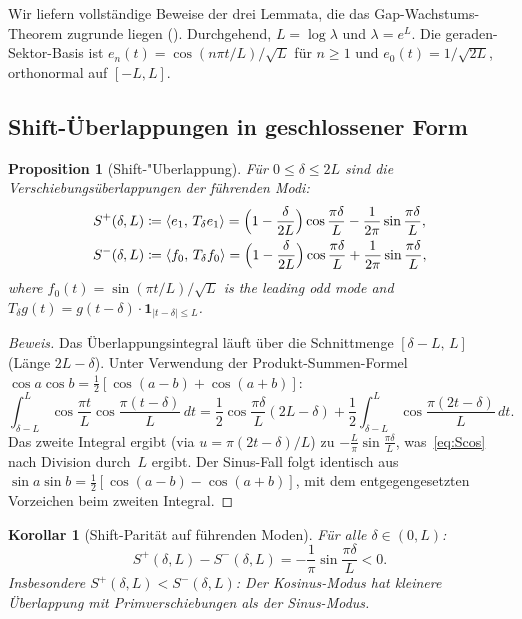 ﻿\documentclass[12pt,a4paper]{article}
\newtheorem{proposition}[theorem]{Proposition}
\newtheorem{corollary}[theorem]{Korollar}
\theoremstyle{definition}
\theoremstyle{remark}
\begin{document}
Wir liefern vollständige Beweise der drei Lemmata, die das Gap-Wachstums-Theorem zugrunde liegen (). Durchgehend, $L = \log\lambda$ und $\lambda = e^L$. Die geraden-Sektor-Basis ist $e_n(t) = \cos(n\pi t/L)/\sqrt{L}$ für $n \geq 1$ und $e_0(t) = 1/\sqrt{2L}$, orthonormal auf $[-L, L]$.

\subsection{Shift-\"Uberlappungen in geschlossener Form}

\begin{proposition}[Shift-"Uberlappung]
\label{prop:overlap-closed}
Für $0 \leq \delta \leq 2L$ sind die Verschiebungsüberlappungen der führenden Modi:
\begin{align}
  S^+(\delta, L) &\coloneqq \langle e_1,\, T_\delta e_1\rangle = \Bigl(1 - \frac{\delta}{2L}\Bigr)\cos\frac{\pi\delta}{L} - \frac{1}{2\pi}\sin\frac{\pi\delta}{L}, \label{eq:Scos} \\
  S^-(\delta, L) &\coloneqq \langle f_0,\, T_\delta f_0\rangle = \Bigl(1 - \frac{\delta}{2L}\Bigr)\cos\frac{\pi\delta}{L} + \frac{1}{2\pi}\sin\frac{\pi\delta}{L}, \label{eq:Ssin}
\end{align}
where $f_0(t) = \sin(\pi t/L)/\sqrt{L}$ is the leading odd mode and $T_\delta g(t) = g(t - \delta)\cdot\mathbf{1}_{|t-\delta|\leq L}$.
\end{proposition}

\begin{proof}[Beweis]
Das Überlappungsintegral läuft über die Schnittmenge $[\delta - L,\,L]$ (Länge $2L - \delta$). Unter Verwendung der Produkt-Summen-Formel $\cos a\cos b = \tfrac{1}{2}[\cos(a-b) + \cos(a+b)]$:
\[
  \int_{\delta-L}^{L} \cos\frac{\pi t}{L}\cos\frac{\pi(t-\delta)}{L}\,dt
  = \frac{1}{2}\cos\frac{\pi\delta}{L}(2L - \delta) + \frac{1}{2}\int_{\delta-L}^{L}\cos\frac{\pi(2t-\delta)}{L}\,dt.
\]
Das zweite Integral ergibt (via $u = \pi(2t-\delta)/L$) zu $-\frac{L}{\pi}\sin\frac{\pi\delta}{L}$, was~\eqref{eq:Scos} nach Division durch~$L$ ergibt. Der Sinus-Fall folgt identisch aus $\sin a\sin b = \tfrac{1}{2}[\cos(a-b) - \cos(a+b)]$, mit dem entgegengesetzten Vorzeichen beim zweiten Integral.
\end{proof}

\begin{corollary}[Shift-Parität auf führenden Moden]
\label{cor:diagonal-parity}
Für alle $\delta \in (0, L)$:
\begin{equation}
\label{eq:parity-diff}
  S^+(\delta, L) - S^-(\delta, L) = -\frac{1}{\pi}\sin\frac{\pi\delta}{L} < 0.
\end{equation}
Insbesondere $S^+(\delta, L) < S^-(\delta, L)$: Der Kosinus-Modus hat \emph{kleinere} Überlappung mit Primverschiebungen als der Sinus-Modus.
\end{corollary}
\end{document}
